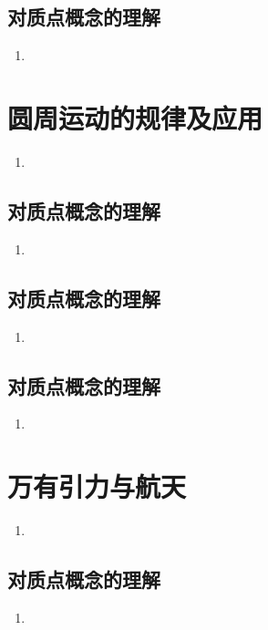 \documentclass[cn,11pt]{elegantbook}
\begin{document}
\section{对质点概念的理解}
\begin{enumerate}
   \item 
\end{enumerate}


\chapter{圆周运动的规律及应用}
\begin{enumerate}
   \item 
\end{enumerate}

\section{对质点概念的理解}
\begin{enumerate}
   \item 
\end{enumerate}

\section{对质点概念的理解}
\begin{enumerate}
   \item 
\end{enumerate}

\section{对质点概念的理解}
\begin{enumerate}
   \item 
\end{enumerate}


\chapter{万有引力与航天}
\begin{enumerate}
   \item 
\end{enumerate}

\section{对质点概念的理解}
\begin{enumerate}
   \item 
\end{enumerate}
\end{document}
